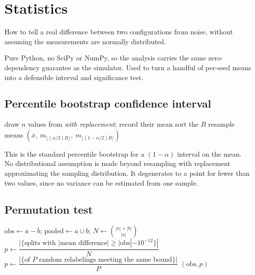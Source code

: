 \section{Statistics}
\label{sec:statistics}

\begin{lede}
How to tell a real difference between two configurations from noise, without
assuming the measurements are normally distributed.
\end{lede}

Pure Python, no SciPy or NumPy, so the analysis carries the same zero-dependency
guarantee as the simulator. Used to turn a handful of per-seed means into a
defensible interval and significance test.

\subsection{Percentile bootstrap confidence interval}

\begin{algorithm}[H]
\caption{}
\begin{algorithmic}[1]
  \State draw $n$ values from  \emph{with replacement}; record their mean
\EndFor
\State sort the $B$ resample means
\State \Return $\left(\overline{x},\ m_{\lfloor (\alpha/2)B \rfloor},\ m_{\lfloor (1-\alpha/2)B \rfloor}\right)$
\end{algorithmic}
\end{algorithm}

This is the standard percentile bootstrap for a $(1-\alpha)$ interval on the
mean. No distributional assumption is made beyond resampling with replacement
approximating the sampling distribution. It degenerates to a point for fewer
than two values, since no variance can be estimated from one sample.

\subsection{Permutation test}

\begin{algorithm}[H]
\caption{}
\begin{algorithmic}[1]
\State $\mathrm{obs} \gets \overline{a} - \overline{b}$;\quad
  $\mathrm{pooled} \gets a \cup b$;\quad
  $N \gets \binom{|a| + |b|}{|a|}$
  \State $p \gets \dfrac{|\{\text{splits with } |\text{mean difference}| \geq |\mathrm{obs}| - 10^{-12}\}|}{N}$
\Else
  \State $p \gets \dfrac{|\{\text{of } P \text{ random relabelings meeting the same bound}\}|}{P}$
\EndIf
\State \Return $(\mathrm{obs}, p)$
\end{algorithmic}
\end{algorithm}

